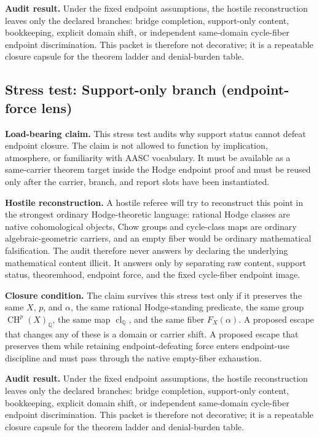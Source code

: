 \documentclass[11pt]{article}
\newcommand{\QQ}{\mathbb{Q}}
\newcommand{\CH}{\operatorname{CH}}
\newcommand{\clQ}{\operatorname{cl}_{\QQ}}
\begin{document}
\par\noindent\textbf{Audit result.} Under the fixed endpoint assumptions, the hostile reconstruction leaves only the declared branches: bridge completion, support-only content, bookkeeping, explicit domain shift, or independent same-domain cycle-fiber endpoint discrimination. This packet is therefore not decorative; it is a repeatable closure capsule for the theorem ladder and denial-burden table.


\subsection{Stress test: Support-only branch (endpoint-force lens)}

\par\noindent\textbf{Load-bearing claim.} This stress test audits why support status cannot defeat endpoint closure. The claim is not allowed to function by implication, atmosphere, or familiarity with AASC vocabulary. It must be available as a same-carrier theorem target inside the Hodge endpoint proof and must be reused only after the carrier, branch, and report slots have been instantiated.

\par\noindent\textbf{Hostile reconstruction.} A hostile referee will try to reconstruct this point in the strongest ordinary Hodge-theoretic language: rational Hodge classes are native cohomological objects, Chow groups and cycle-class maps are ordinary algebraic-geometric carriers, and an empty fiber would be ordinary mathematical falsification. The audit therefore never answers by declaring the underlying mathematical content illicit. It answers only by separating raw content, support status, theoremhood, endpoint force, and the fixed cycle-fiber endpoint image.

\par\noindent\textbf{Closure condition.} The claim survives this stress test only if it preserves the same $X$, $p$, and $\alpha$, the same rational Hodge-standing predicate, the same group $\CH^p(X)_\QQ$, the same map $\clQ$, and the same fiber $F_X(\alpha)$. A proposed escape that changes any of these is a domain or carrier shift. A proposed escape that preserves them while retaining endpoint-defeating force enters endpoint-use discipline and must pass through the native empty-fiber exhaustion.

\par\noindent\textbf{Audit result.} Under the fixed endpoint assumptions, the hostile reconstruction leaves only the declared branches: bridge completion, support-only content, bookkeeping, explicit domain shift, or independent same-domain cycle-fiber endpoint discrimination. This packet is therefore not decorative; it is a repeatable closure capsule for the theorem ladder and denial-burden table.
\end{document}
